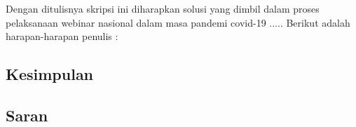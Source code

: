 \chapter{\babLima}

Dengan ditulisnya skripsi ini diharapkan solusi yang dimbil dalam proses pelaksanaan webinar nasional dalam masa pandemi covid-19 ..... Berikut adalah harapan-harapan penulis :

\section{Kesimpulan}


\section{Saran}